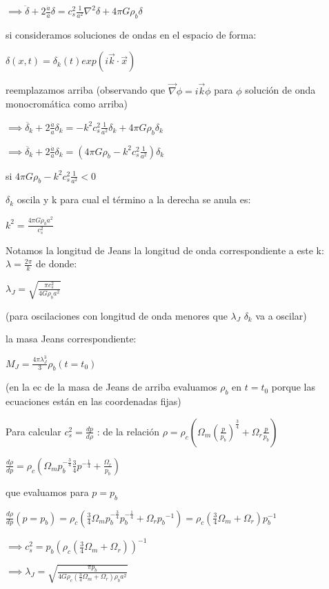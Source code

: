 \documentclass[12pt]{book}
\begin{document}
$\implies \ddot{\delta} + 2 \frac{\dot{a}}{a} \delta = c_s^2 \frac{1}{a^2} \nabla^2{\delta} + 4 \pi G \rho_b \delta$

si consideramos soluciones de ondas en el espacio de forma:

$\delta(x,t) = \delta_k(t) exp(i \vec{k} \cdot \vec{x})$

reemplazamos arriba (observando que $\vec{\nabla}{\phi} = i \vec{k} \phi$ para $\phi$ solución de onda monocromática como arriba)


$\implies \ddot{\delta_k} + 2 \frac{\dot{a}}{a} \delta_k = -k^2 c_s^2 \frac{1}{a^2} \delta_k + 4 \pi G \rho_b \delta_k$

$\implies \ddot{\delta_k} + 2 \frac{\dot{a}}{a} \delta_k = (4 \pi G \rho_b - k^2 c_s^2 \frac{1}{a^2}) \delta_k $

si $4 \pi G \rho_b - k^2 c_s^2 \frac{1}{a^2} < 0 $ 

$\delta_k$ oscila y k para cual el término a la derecha se anula es:
 
$k^2 = \frac{4 \pi G \rho_b a^2}{c_s^2}$

Notamos la longitud de Jeans la longitud de onda correspondiente a este k: $\lambda = \frac{2\pi}{k}$ de donde:

$\lambda_J = \sqrt{\frac{\pi c_s^2}{4 G \rho_b a^2}}$

(para oscilaciones con longitud de onda menores que $\lambda_J$ $\delta_k$ va a oscilar)

la masa Jeans correspondiente:

$M_J = \frac{4 \pi \lambda_J^3}{3} \rho_b(t=t_0) $ 

(en la ec de la masa de Jeans de arriba  evaluamos $\rho_b$ en $t=t_0$ porque las ecuaciones están en las coordenadas fijas)

Para calcular $c_s^2 = \frac{dp}{d\rho}$ : de la relación $\rho = \rho_c (\Omega_m (\frac{p}{p_b})^{\frac{3}{4}} + \Omega_r \frac{p}{p_b}  )$

$\frac{d\rho}{dp} = \rho_c (\Omega_m p_b^{-\frac{3}{4}} \frac{3}{4} p^{-\frac{1}{4}} + \frac{\Omega_r}{p_b} )$

que evaluamos para $p=p_b$

$\frac{d\rho}{dp}(p=p_b) = \rho_c (\frac{3}{4} \Omega_m p_b^{-\frac{3}{4}}  p_b^{-\frac{1}{4}} + \Omega_r{p_b}^{-1} ) = 
 \rho_c (\frac{3}{4} \Omega_m + \Omega_r) p_b^{-1} $


$\implies c_s^2 = p_b (\rho_c (\frac{3}{4} \Omega_m + \Omega_r))^{-1} $

$\implies \lambda_J = \sqrt{\frac{\pi p_b}{4 G \rho_c (\frac{3}{4} \Omega_m + \Omega_r)\rho_b a^2}}$
\end{document}
